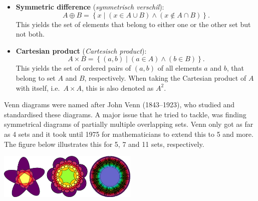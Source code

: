 \begin{itemize}
	\fi
	

	
	\item \textbf{Symmetric difference} (\textit{symmetrisch verschil}): 
	$$
	A\oplus B=\left\{x\mid \left(x\in A\cup B\right)\wedge \left(x\notin A\cap B\right)\right\}.
	$$
	This yields the set of elements that belong to either one or the other set but not both.
	
	\item \textbf{Cartesian product} (\textit{Cartesisch product}): 
	$$
	A\times B=\left\{\left(a,b\right)\mid \left(a\in A\right)\wedge\left(b\in B\right)\right\}.
	$$
	This yields the set of ordered pairs of $\left(a,b\right)$ of all elements $a$ and $b$, that belong to set $A$ and $B$, respectively. When taking the Cartesian product of $A$ with itself, i.e.\ $A\times A$, this is also denoted as $A^2$.
\end{itemize}




\ifcourse
\begin{remark}
	Venn diagrams were named after John Venn (1843--1923), who studied and standardised these diagrams.
	A major issue that he tried to tackle, was finding symmetrical diagrams of partially multiple overlapping sets. Venn only got as far as 4 sets and it took until 1975 for mathematicians to extend this to 5 and more. The figure below illustrates this for 5, 7 and 11 sets, respectively. %
	\begin{center}
		\includegraphics[width=0.5\textwidth]{fig_sets_3.jpg}
	\end{center}
	
\end{remark}
\fi



